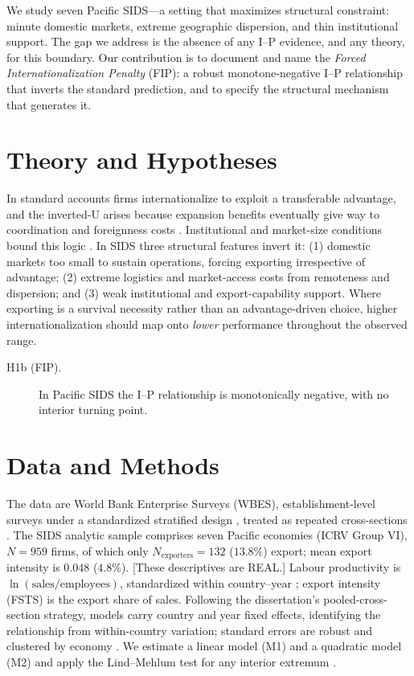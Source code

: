 \documentclass[12pt,a4paper]{article}
\begin{document}
We study seven Pacific SIDS---a setting that maximizes structural constraint:
minute domestic markets, extreme geographic dispersion, and thin institutional
support. The gap we address is the absence of any I--P evidence, and any
theory, for this boundary. Our contribution is to document and name the
\emph{Forced Internationalization Penalty} (FIP): a robust monotone-negative
I--P relationship that inverts the standard prediction, and to specify the
structural mechanism that generates it.

\section{Theory and Hypotheses}
In standard accounts firms internationalize to exploit a transferable
advantage, and the inverted-U arises because expansion benefits eventually
give way to coordination and foreignness costs
\citep{lubeamish2004,marano2016}. Institutional and market-size conditions
bound this logic \citep{north1990,khanna2010}. In SIDS three structural
features invert it: (1) domestic markets too small to sustain operations,
forcing exporting irrespective of advantage; (2) extreme logistics and
market-access costs from remoteness and dispersion; and (3) weak institutional
and export-capability support. Where exporting is a survival necessity rather
than an advantage-driven choice, higher internationalization should map onto
\emph{lower} performance throughout the observed range.

\begin{description}
\item[H1b (FIP).] In Pacific SIDS the I--P relationship is monotonically
negative, with no interior turning point.
\end{description}

\section{Data and Methods}
The data are World Bank Enterprise Surveys (WBES), establishment-level surveys
under a standardized stratified design \citep{aterido2011}, treated as
repeated cross-sections \citep{deaton1985,verbeek2008}. The SIDS analytic
sample comprises seven Pacific economies (ICRV Group VI), $N = 959$ firms, of
which only $N_{\text{exporters}} = 132$ ($13.8\%$) export; mean export
intensity is $0.048$ ($4.8\%$). [These descriptives are REAL.] Labour
productivity is $\ln(\text{sales}/\text{employees})$, standardized within
country--year \citep{richard2009}; export intensity (FSTS) is the export share
of sales. Following the dissertation's pooled-cross-section strategy, models
carry country and year fixed effects, identifying the relationship from
within-country variation; standard errors are robust and clustered by economy
\citep{cameron2015}. We estimate a linear model (M1) and a quadratic model
(M2) and apply the Lind--Mehlum test for any interior extremum
\citep{lindmehlum2010}.
\end{document}
